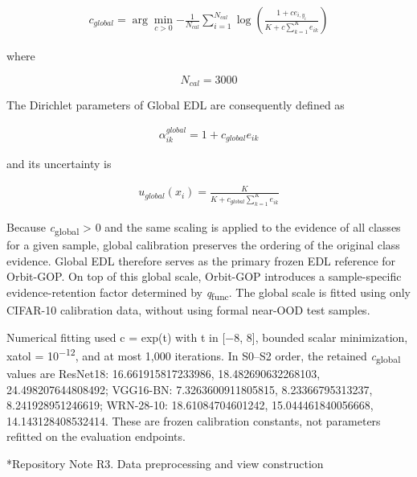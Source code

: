 \documentclass[11pt,a4paper]{article}
\makeatletter
\renewcommand\section{\@startsection{section}{1}{\z@}{-2.2ex plus -.8ex minus -.2ex}{1ex plus .2ex}{\normalfont\large\bfseries\raggedright}}
\makeatother
\begin{document}
\begin{equation}
\begin{array}{r}
c_{global} = \arg{\min_{c > 0}{- \frac{1}{N_{cal}}\sum_{i = 1}^{N_{cal}}{\log\left( \frac{1 + ce_{i,y_{i}}}{K + c\sum_{k = 1}^{K}e_{ik}} \right)}}}
\end{array}
\label{eq:supp11}
\end{equation}

where

\[N_{cal} = 3000\]

The Dirichlet parameters of Global EDL are consequently defined as

\begin{equation}
\begin{array}{r}
\alpha_{ik}^{global} = 1 + c_{global}e_{ik}
\end{array}
\label{eq:supp12}
\end{equation}

and its uncertainty is

\begin{equation}
\begin{array}{r}
u_{global}(x_{i}) = \frac{K}{K + c_{global}\sum_{k = 1}^{K}e_{ik}}
\end{array}
\label{eq:supp13}
\end{equation}

Because \emph{c}\textsubscript{global} \textgreater{} 0 and the same scaling is applied to the evidence of all classes for a given sample, global calibration preserves the ordering of the original class evidence. Global EDL therefore serves as the primary frozen EDL reference for Orbit-GOP. On top of this global scale, Orbit-GOP introduces a sample-specific evidence-retention factor determined by \emph{q}\textsubscript{func}. The global scale is fitted using only CIFAR-10 calibration data, without using formal near-OOD test samples.

Numerical fitting used c = exp(t) with t in {[}−8, 8{]}, bounded scalar minimization, xatol = 10\textsuperscript{−12}, and at most 1,000 iterations. In S0--S2 order, the retained \emph{c}\textsubscript{global} values are ResNet18: 16.661915817233986, 18.482690632268103, 24.498207644808492; VGG16-BN: 7.3263600911805815, 8.23366795313237, 8.241928951246619; WRN-28-10: 18.61084704601242, 15.044461840056668, 14.143128408532414. These are frozen calibration constants, not parameters refitted on the evaluation endpoints.

\section*{Repository Note R3. Data preprocessing and view construction}\label{supplementary-note-s3.-data-preprocessing-and-view-construction}
\end{document}
